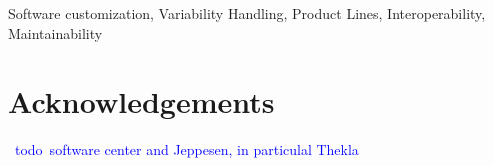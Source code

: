 \documentclass[twocolumn,]{elsarticle}
\newcommand{\todo}[1]{\textcolor{blue}{\ding{46}~{\sf todo}~#1}}
\begin{document}
 
\maketitle
\begin{abstract}
\todo{To be refined and contextualized in the field of interoperability} This paper describes the process of handling the variability needs of a company which does not follow traditional product lines approaches and where the work of code maintenance is divided between the company and their customers. More specifically, this study focuses on improving the customizability of interfaces used for data transmission through different system, where misinterpretations can occur leading to problematic communication.
We document the guidelines for decision making and suggest ways for future work. We pushed the prototype on the company's code repository, ready to be used by their employees and hopefully be proven useful. 
We hope that the findings of this study could support the customization endeavors of companies of similar technical contexts. 
\end{abstract}

\begin{keyword}
Software customization, Variability Handling, Product Lines, Interoperability, Maintainability
\end{keyword}










\section*{Acknowledgements}
\todo{software center and Jeppesen, in particulal Thekla}			

\balance





\end{document}
